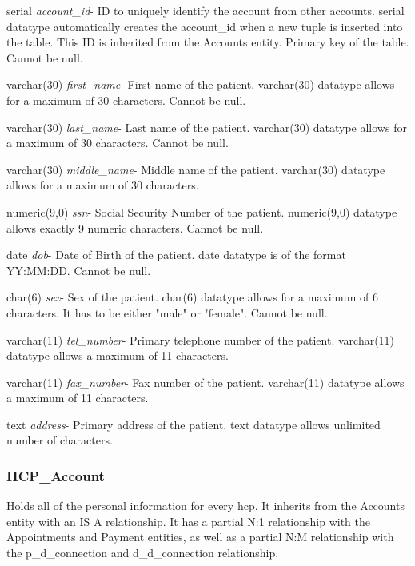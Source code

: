 \documentclass[10pt]{report}
\begin{document}
\begin{description}
\item serial \textit{account\_id}- ID to uniquely identify the account from other accounts. serial datatype automatically creates the account\_id when a new tuple is inserted into the table.  This ID is inherited from the Accounts entity. Primary key of the table.  Cannot be null.
\item varchar(30) \textit{first\_name}-  First name of the patient.  varchar(30) datatype allows for a maximum of 30 characters.  Cannot be null.
\item varchar(30) \textit{last\_name}- Last name of the patient.  varchar(30) datatype allows for a maximum of 30 characters.  Cannot be null.
\item varchar(30) \textit{middle\_name}- Middle name of the patient. varchar(30) datatype allows for a maximum of 30 characters.
\item numeric(9,0) \textit{ssn}- Social Security Number of the patient. numeric(9,0) datatype allows exactly 9 numeric characters.  Cannot be null.
\item date \textit{dob}- Date of Birth of the patient.  date datatype is of the format YY:MM:DD.  Cannot be null.
\item char(6) \textit{sex}- Sex of the patient. char(6) datatype allows for a maximum of 6 characters.  It has to be either "male" or "female".  Cannot be null.
\item varchar(11) \textit{tel\_number}- Primary telephone number of the patient.  varchar(11) datatype allows a maximum of 11 characters.
\item varchar(11) \textit{fax\_number}- Fax number of the patient.  varchar(11) datatype allows a maximum of 11 characters.
\item text \textit{address}- Primary address of the patient.  text datatype allows unlimited number of characters.
\end{description}

\subsubsection{HCP\_Account}
Holds all of the personal information for every hcp.  It inherits from the Accounts entity with an IS A relationship.  It has a partial N:1 relationship with the Appointments and Payment entities, as well as a partial N:M relationship with the p\_d\_connection and d\_d\_connection relationship.
\end{document}
